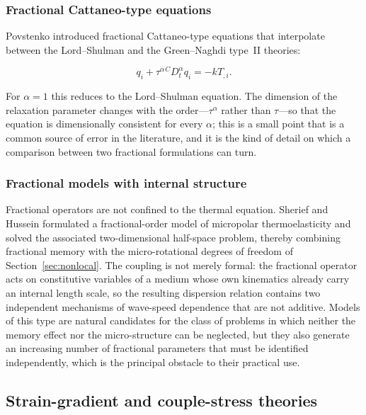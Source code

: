 \subsubsection{Fractional Cattaneo-type equations}

Povstenko \cite{Povstenko2011} introduced fractional Cattaneo-type equations that interpolate between the Lord--Shulman and the Green--Naghdi type~II theories:

\begin{equation}
q_i + \tau^\alpha {}^C D_t^\alpha q_i = -k T_{,i}.
\label{eq:11.4}
\end{equation}

For $\alpha = 1$ this reduces to the Lord--Shulman equation. The dimension of the relaxation parameter changes with the order---$\tau^\alpha$ rather than $\tau$---so that the equation is dimensionally consistent for every $\alpha$; this is a small point that is a common source of error in the literature, and it is the kind of detail on which a comparison between two fractional formulations can turn.

\subsubsection{Fractional models with internal structure}

Fractional operators are not confined to the thermal equation. Sherief and Hussein \cite{Sharma2022} formulated a fractional-order model of micropolar thermoelasticity and solved the associated two-dimensional half-space problem, thereby combining fractional memory with the micro-rotational degrees of freedom of Section~\ref{sec:nonlocal}. The coupling is not merely formal: the fractional operator acts on constitutive variables of a medium whose own kinematics already carry an internal length scale, so the resulting dispersion relation contains two independent mechanisms of wave-speed dependence that are not additive. Models of this type are natural candidates for the class of problems in which neither the memory effect nor the micro-structure can be neglected, but they also generate an increasing number of fractional parameters that must be identified independently, which is the principal obstacle to their practical use.

\subsection{Strain-gradient and couple-stress theories}
\label{sec:11.2}


